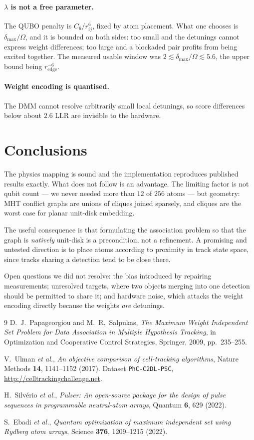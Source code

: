\documentclass[10pt,twocolumn]{article}
\begin{document}
\paragraph{$\lambda$ is not a free parameter.} The QUBO penalty is $C_6/r_{ij}^6$,
fixed by atom placement. What one chooses is $\delta_{\max}/\Omega$, and it is
bounded on both sides: too small and the detunings cannot express weight
differences; too large and a blockaded pair profits from being excited together.
The measured usable window was $2 \lesssim \delta_{\max}/\Omega \lesssim 5.6$,
the upper bound being $r_{\text{edge}}^{-6}$.

\paragraph{Weight encoding is quantised.} The DMM cannot resolve arbitrarily
small local detunings, so score differences below about $2.6$ LLR are invisible
to the hardware.

\section{Conclusions}

The physics mapping is sound and the implementation reproduces published results
exactly. What does not follow is an advantage. The limiting factor is not qubit
count --- we never needed more than $12$ of $256$ atoms --- but geometry: MHT
conflict graphs are unions of cliques joined sparsely, and cliques are the worst
case for planar unit-disk embedding.

The useful consequence is that formulating the association problem so that the
graph is \emph{natively} unit-disk is a precondition, not a refinement. A
promising and untested direction is to place atoms according to proximity in
track state space, since tracks sharing a detection tend to be close there.

Open questions we did not resolve: the bias introduced by repairing measurements;
unresolved targets, where two objects merging into one detection should be
permitted to share it; and hardware noise, which attacks the weight encoding
directly because the weights \emph{are} detunings.

\begin{thebibliography}{9}\small
{}
D.~J.~Papageorgiou and M.~R.~Salpukas,
\emph{The Maximum Weight Independent Set Problem for Data Association in Multiple
Hypothesis Tracking}, in Optimization and Cooperative Control Strategies,
Springer, 2009, pp.~235--255.

V.~Ulman \emph{et al.},
\emph{An objective comparison of cell-tracking algorithms},
Nature Methods \textbf{14}, 1141--1152 (2017).
Dataset \texttt{PhC-C2DL-PSC}, \url{http://celltrackingchallenge.net}.

H.~Silv\'erio \emph{et al.},
\emph{Pulser: An open-source package for the design of pulse sequences in
programmable neutral-atom arrays}, Quantum \textbf{6}, 629 (2022).

S.~Ebadi \emph{et al.},
\emph{Quantum optimization of maximum independent set using Rydberg atom arrays},
Science \textbf{376}, 1209--1215 (2022).
\end{thebibliography}
\end{document}
